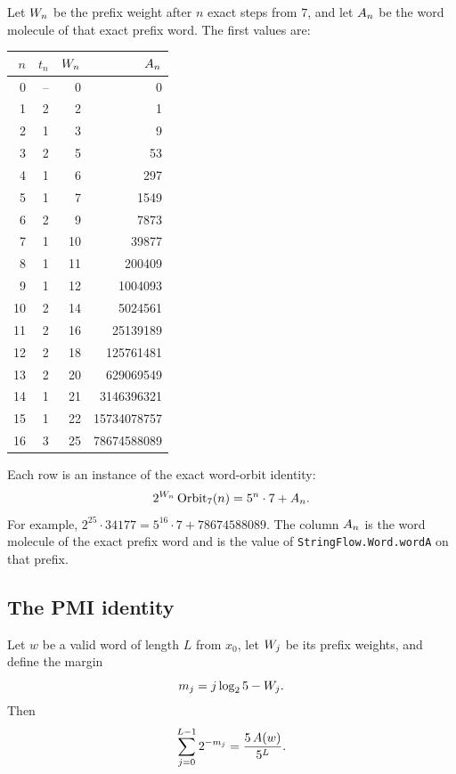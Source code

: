 Let $W_n$ be the prefix weight after $n$ exact steps from
$7$, and let $A_n$ be the word molecule of that exact prefix word.
The first values are:
\begin{center}
\scriptsize
\begin{tabular}{@{}rrrr@{}}
\toprule
$n$ & $t_n$ & $W_n$ & $A_n$ \\
\midrule
0 & -- & 0 & 0 \\
1 & 2 & 2 & 1 \\
2 & 1 & 3 & 9 \\
3 & 2 & 5 & 53 \\
4 & 1 & 6 & 297 \\
5 & 1 & 7 & 1549 \\
6 & 2 & 9 & 7873 \\
7 & 1 & 10 & 39877 \\
8 & 1 & 11 & 200409 \\
9 & 1 & 12 & 1004093 \\
10 & 2 & 14 & 5024561 \\
11 & 2 & 16 & 25139189 \\
12 & 2 & 18 & 125761481 \\
13 & 2 & 20 & 629069549 \\
14 & 1 & 21 & 3146396321 \\
15 & 1 & 22 & 15734078757 \\
16 & 3 & 25 & 78674588089 \\
\bottomrule
\end{tabular}
\end{center}

Each row is an instance of the exact word-orbit identity:
\begin{equation*}
  2^{W_n}\,\mathrm{Orbit}_7(n)=5^n\cdot7+A_n.
\end{equation*}
For example, $2^{25}\cdot34177=5^{16}\cdot7+78674588089$.  The column
$A_n$ is the word molecule of the exact prefix word and is the
value of \texttt{StringFlow.Word.wordA} on that prefix.

\subsection{The PMI identity}

\begin{theorem}\label{thm:pmi}
Let $w$ be a valid word of length $L$ from $x_0$, let
$W_j$ be its prefix weights, and define the margin
\begin{equation*}
  m_j=j\log_2 5-W_j.
\end{equation*}
Then
\begin{equation*}
  \sum_{j=0}^{L-1} 2^{-m_j}
    =\frac{5\,A(w)}{5^L}.
\end{equation*}
\end{theorem}

